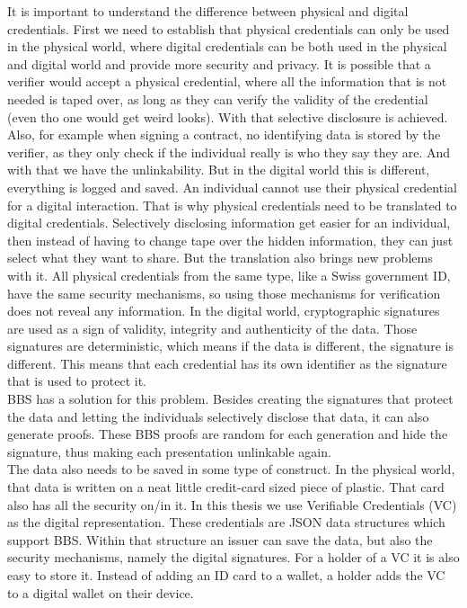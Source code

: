 \documentclass[
	a4paper               %
	,BCOR=0mm            %
	,bibliography=totoc   %
	,listof=totoc         %
	,monolingual
	,twoside=false
]{bfhthesis}              %
\begin{document}
It is important to understand the difference between physical and digital credentials. First we need to establish that physical credentials can only be used in the physical world, where digital credentials can be both used in the physical and digital world and provide more security and privacy. It is possible that a verifier would accept a physical credential, where all the information that is not needed is taped over, as long as they can verify the validity of the credential (even tho one would get weird looks). With that selective disclosure is achieved. Also, for example when signing a contract, no identifying data is stored by the verifier, as they only check if the individual really is who they say they are. And with that we have the unlinkability. But in the digital world this is different, everything is logged and saved. An individual cannot use their physical credential for a digital interaction. That is why physical credentials need to be translated to digital credentials. Selectively disclosing information get easier for an individual, then instead of having to change tape over the hidden information, they can just select what they want to share. But the translation also brings new problems with it. All physical credentials from the same type, like a Swiss government ID, have the same security mechanisms, so using those mechanisms for verification does not reveal any information. In the digital world, cryptographic signatures are used as a sign of validity, integrity and authenticity of the data. Those signatures are deterministic, which means if the data is different, the signature is different. This means that each credential has its own identifier as the signature that is used to protect it. \\

BBS has a solution for this problem. Besides creating the signatures that protect the data and letting the individuals selectively disclose that data, it can also generate proofs. These BBS proofs are random for each generation and hide the signature, thus making each presentation unlinkable again. \\

The data also needs to be saved in some type of construct. In the physical world, that data is written on a neat little credit-card sized piece of plastic. That card also has all the security on/in it. In this thesis we use Verifiable Credentials (VC)\cite{verifiable-credentials} as the digital representation. These credentials are JSON data structures which support BBS. Within that structure an issuer can save the data, but also the security mechanisms, namely the digital signatures. For a holder of a VC it is also easy to store it. Instead of adding an ID card to a wallet, a holder adds the VC to a digital wallet on their device. \\
\end{document}
